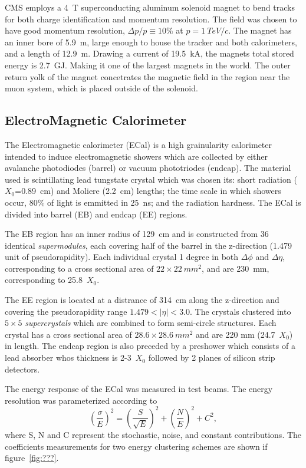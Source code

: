 CMS employs a 4~T superconducting aluminum solenoid magnet to bend tracks for 
both charge identification and momentum resolution.  The field was
chosen to have good momentum resolution, $\Delta p/p\equiv10\%$ at 
$p=1~TeV/c$.  The magnet has an inner bore of 5.9~m, large enough to house
the tracker and both calorimeters, and a length of 12.9~m.  Drawing a 
current of 19.5~kA, the magnets total stored energy is 2.7~GJ.  Making it
one of the largest magnets in the world.  
The outer return yolk of the magnet concetrates the magnetic field in the
region near the muon system, which is placed outside of the solenoid.  

\subsection{ElectroMagnetic Calorimeter}
\label{sec:ECal}

The Electromagnetic calorimeter (ECal) is a high grainularity calorimeter
intended to induce electromagnetic showers which are collected by either
avalanche photodiodes (barrel) or vacuum phototriodes (endcap).  The 
material used is scintillating lead tungstate crystal
which was chosen its: short radiation ($X_0$=0.89~cm) and Moliere (2.2~cm) 
lengths; the time scale in which showers occur, 80\% of light is emmitted
in 25~ns; and the radiation hardness.  The ECal is divided into barrel (EB)
and endcap (EE) regions.

The EB region has an inner radius of 129~cm and is constructed from 36
identical {\it supermodules}, each covering half of the barrel in the 
z-direction (1.479 unit of pseudorapidity).  Each individual crystal 
1 degree in both $\Delta\phi$ and $\Delta\eta$, corresponding to a cross
sectional area of $22\times22~mm^2$, and are 230~mm, corresponding to 
25.8~$X_0$.

The EE region is located at a distrance of 314~cm along the z-direction
and covering the pseudorapidity range $1.479<|\eta|<3.0$.  The crystals
clustered into $5\times5$ {\it supercrystals} which are combined to form
semi-circle structures.  Each crystal has a cross sectional area of 
$28.6\times28.6~mm^2$ and are 220 mm (24.7~$X_0$) in length.  The endcap 
region is also preceded by a preshower which consists of a lead absorber
whos thickness is 2-3~$X_0$ followed by 2 planes of silicon strip detectors.

The energy response of the ECal was measured in test beams.  The energy 
resolution was parameterized according to
\begin{equation}
\left(\frac{\sigma}{E}\right)^2 = \left(\frac{S}{\sqrt{E}}\right)^2 + \left(\frac{N}{E}\right)^2 + C^2,
\end{equation}
where S, N and C represent the stochastic, noise, and constant contributions.
The coefficients measurements for two energy clustering schemes are shown
if figure~\ref{fig:???}.

